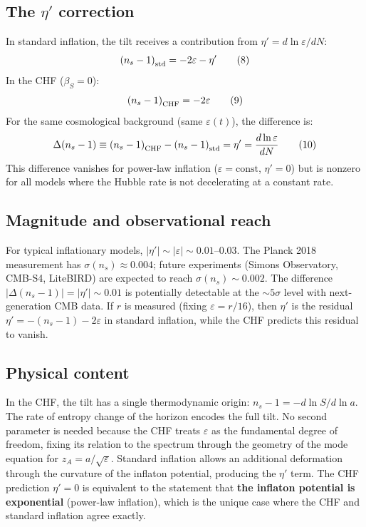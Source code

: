 \documentclass[12pt,a4paper]{article}
\begin{document}
\subsection{The $\eta'$ correction}

In standard inflation, the tilt receives a contribution from $\eta' = d\ln\varepsilon/dN$:
\begin{equation}
\left(n_s - 1\right)_{\rm std} = -2\varepsilon - \eta' \tag{8}
\end{equation}
In the CHF ($\beta_S = 0$):
\begin{equation}
\left(n_s - 1\right)_{\rm CHF} = -2\varepsilon \tag{9}
\end{equation}
For the same cosmological background (same $\varepsilon(t)$), the difference is:
\begin{equation}
\Delta(n_s - 1) \equiv \left(n_s - 1\right)_{\rm CHF} - \left(n_s - 1\right)_{\rm std} = \eta' = \frac{d\ln\varepsilon}{dN} \tag{10}
\end{equation}
This difference vanishes for power-law inflation ($\varepsilon = \text{const}$, $\eta' = 0$) but is nonzero for all models where the Hubble rate is not decelerating at a constant rate.

\subsection{Magnitude and observational reach}

For typical inflationary models, $|\eta'| \sim |\varepsilon| \sim 0.01$--$0.03$. The Planck 2018 measurement has $\sigma(n_s) \approx 0.004$; future experiments (Simons Observatory, CMB-S4, LiteBIRD) are expected to reach $\sigma(n_s) \sim 0.002$. The difference $|\Delta(n_s-1)| = |\eta'| \sim 0.01$ is potentially detectable at the $\sim 5\sigma$ level with next-generation CMB data. If $r$ is measured (fixing $\varepsilon = r/16$), then $\eta'$ is the residual $\eta' = -(n_s - 1) - 2\varepsilon$ in standard inflation, while the CHF predicts this residual to vanish.

\subsection{Physical content}

In the CHF, the tilt has a single thermodynamic origin: $n_s - 1 = -d\ln S/d\ln a$. The rate of entropy change of the horizon encodes the full tilt. No second parameter is needed because the CHF treats $\varepsilon$ as the fundamental degree of freedom, fixing its relation to the spectrum through the geometry of the mode equation for $z_A = a/\sqrt\varepsilon$. Standard inflation allows an additional deformation through the curvature of the inflaton potential, producing the $\eta'$ term. The CHF prediction $\eta' = 0$ is equivalent to the statement that \textbf{the inflaton potential is exponential} (power-law inflation), which is the unique case where the CHF and standard inflation agree exactly.
\end{document}
